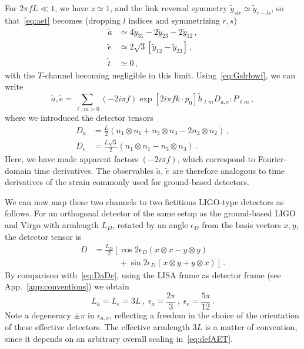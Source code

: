 \documentclass[aps,showpacs,twocolumn,prd,superscriptaddress,nofootinbib]{revtex4-1}
\newcommand{\be}{\begin{equation}}
\newcommand{\ee}{\end{equation}}
\newcommand{\bsub}{\begin{subequations}}
\newcommand{\esub}{\end{subequations}}
\newcommand{\nn}{\nonumber}
\begin{document}
For $2\pi f L \ll 1$, we have $z\simeq 1$, and the link reversal symmetry $\tilde{y}_{slr} \simeq \tilde{y}_{r-ls}$, so that~\eqref{eq:aet} becomes (dropping $l$ indices and symmetrizing $r,s$)
\bsub\label{eq:aetlowf}
\begin{align}
	\tilde{a} &\simeq 4\tilde{y}_{31} - 2 \tilde{y}_{23} - 2 \tilde{y}_{12} \,,\\
	\tilde{e} &\simeq 2\sqrt{3} \left[ \tilde{y}_{12}  - \tilde{y}_{23} \right] \,,\\
	\tilde{t} &\simeq 0 \,,
\end{align}
\esub
with the $T$-channel becoming negligible in this limit. Using~\eqref{eq:Gslrlowf}, we can write
\be\label{eq:aelowfmodes}
	\tilde{a}, \tilde{e} = \sum_{\ell, m>0} (-2i\pi f) \exp\left[ 2 i \pi f k\cdot p_{0} \right] \tilde{h}_{\ell m} D_{a,e} : P_{\ell m} \,,
\ee
where we introduced the detector tensors
\bsub\label{eq:DaDe}
\begin{align}
	D_{a} &= \frac{L}{2} \left( n_{1}\otimes n_{1} + n_{3} \otimes n_{3} - 2 n_{2} \otimes n_{2} \right) \,,\\
	D_{e} &= \frac{L\sqrt{3}}{2} \left( n_{1} \otimes n_{1} - n_{3} \otimes n_{3} \right) \,.
\end{align}
\esub
Here, we have made apparent factors $(-2i\pi f)$, which correspond to Fourier-domain time derivatives.
The observables $\tilde{a}$, $\tilde{e}$ are therefore analogous to time derivatives of the strain commonly used for ground-based detectors.

We can now map these two channels to two fictitious LIGO-type detectors as follows. For an orthogonal detector of the same setup as the ground-based LIGO and Virgo with armlength $L_{D}$, rotated by an angle $\epsilon_{D}$ from the basis vectors $x,y$, the detector tensor is
\begin{align}
	D &= \frac{L_{D}}{2} \left[ \cos 2\epsilon_{D} \left( x\otimes x - y\otimes y \right) \right. \nn\\
	& \qquad\quad + \left. \sin 2\epsilon_{D} \left( x\otimes y + y \otimes x\right) \right] \,.
\end{align}
By comparison with~\eqref{eq:DaDe}, using the LISA frame as detector frame (see App.~\ref{app:conventions}) we obtain
\be
	L_{a} = L_{e} = 3L \,, \; \epsilon_{a} = \frac{2\pi}{3} \,, \; \epsilon_{e} = \frac{5\pi}{12} \,.
\ee
Note a degeneracy $\pm \pi$ in $\epsilon_{a,e}$, reflecting a freedom in the choice of the orientation of these effective detectors. The effective armlength $3L$ is a matter of convention, since it depends on an arbitrary overall scaling in~\eqref{eq:defAET}.
\end{document}
